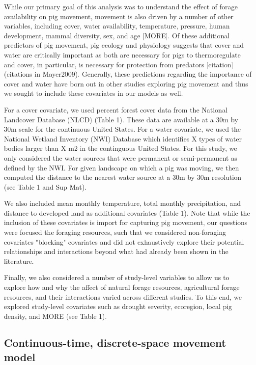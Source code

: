 \documentclass[a4paper]{article}
\begin{document}
While our primary goal of this analysis was to understand the effect of forage availability on pig movement, movement is also driven by a number of other variables, including cover, water availability, temperature, pressure, human development, mammal diversity, sex, and age \citep{McClure2015,Garza2017,Kay2017} [MORE].  Of these additional predictors of pig movement, pig ecology and physiology suggests that cover and water are critically important as both are necessary for pigs to thermoregulate \citep{Choquenot1996a} and cover, in particular, is necessary for protection from predators [citation] (citations in Mayer2009). Generally, these predictions regarding the importance of cover and water have born out in other studies exploring pig movement\citep[e.g.][]{Kay2017} and thus we sought to include these covariates in our models as well.

For a cover covariate, we used percent forest cover data from the National Landcover Database (NLCD) (Table 1). These data are available at a 30m by 30m scale for the continuous United States. For a water covariate, we used the National Wetland Inventory (NWI) Database which identifies X types of water bodies larger than X m2 in the continguous United States. For this study, we only considered the water sources that were permanent or semi-permanent as defined by the NWI. For given landscape on which a pig was moving, we then computed the distance to the nearest water source at a 30m by 30m resolution (see Table 1 and Sup Mat). 

We also included mean monthly temperature, total monthly precipitation, and distance to developed land as additional covariates (Table 1). Note that while the inclusion of these covariates is import for capturing pig movement, our questions were focused the foraging resources, such that we considered non-foraging covariates "blocking" covariates and did not exhaustively explore their potential relationships and interactions beyond what had already been shown in the literature.  

Finally, we also considered a number of study-level variables to allow us to explore how and why the affect of natural forage resources, agricultural forage resources, and their interactions varied across different studies. To this end, we explored study-level covariates such as drought severity, ecoregion, local pig density, and MORE (see Table 1). 

\subsection*{Continuous-time, discrete-space movement model}
\end{document}
